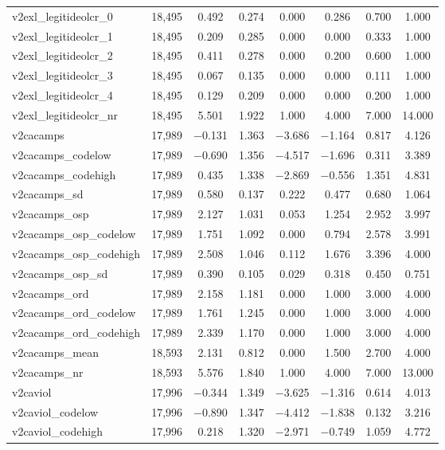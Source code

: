 \begin{table}[!htbp]
\begin{tabular}{@{\extracolsep{5pt}}lccccccc}
v2exl\_legitideolcr\_0 & 18,495 & 0.492 & 0.274 & 0.000 & 0.286 & 0.700 & 1.000 \\ 
v2exl\_legitideolcr\_1 & 18,495 & 0.209 & 0.285 & 0.000 & 0.000 & 0.333 & 1.000 \\ 
v2exl\_legitideolcr\_2 & 18,495 & 0.411 & 0.278 & 0.000 & 0.200 & 0.600 & 1.000 \\ 
v2exl\_legitideolcr\_3 & 18,495 & 0.067 & 0.135 & 0.000 & 0.000 & 0.111 & 1.000 \\ 
v2exl\_legitideolcr\_4 & 18,495 & 0.129 & 0.209 & 0.000 & 0.000 & 0.200 & 1.000 \\ 
v2exl\_legitideolcr\_nr & 18,495 & 5.501 & 1.922 & 1.000 & 4.000 & 7.000 & 14.000 \\ 
v2cacamps & 17,989 & $-$0.131 & 1.363 & $-$3.686 & $-$1.164 & 0.817 & 4.126 \\ 
v2cacamps\_codelow & 17,989 & $-$0.690 & 1.356 & $-$4.517 & $-$1.696 & 0.311 & 3.389 \\ 
v2cacamps\_codehigh & 17,989 & 0.435 & 1.338 & $-$2.869 & $-$0.556 & 1.351 & 4.831 \\ 
v2cacamps\_sd & 17,989 & 0.580 & 0.137 & 0.222 & 0.477 & 0.680 & 1.064 \\ 
v2cacamps\_osp & 17,989 & 2.127 & 1.031 & 0.053 & 1.254 & 2.952 & 3.997 \\ 
v2cacamps\_osp\_codelow & 17,989 & 1.751 & 1.092 & 0.000 & 0.794 & 2.578 & 3.991 \\ 
v2cacamps\_osp\_codehigh & 17,989 & 2.508 & 1.046 & 0.112 & 1.676 & 3.396 & 4.000 \\ 
v2cacamps\_osp\_sd & 17,989 & 0.390 & 0.105 & 0.029 & 0.318 & 0.450 & 0.751 \\ 
v2cacamps\_ord & 17,989 & 2.158 & 1.181 & 0.000 & 1.000 & 3.000 & 4.000 \\ 
v2cacamps\_ord\_codelow & 17,989 & 1.761 & 1.245 & 0.000 & 1.000 & 3.000 & 4.000 \\ 
v2cacamps\_ord\_codehigh & 17,989 & 2.339 & 1.170 & 0.000 & 1.000 & 3.000 & 4.000 \\ 
v2cacamps\_mean & 18,593 & 2.131 & 0.812 & 0.000 & 1.500 & 2.700 & 4.000 \\ 
v2cacamps\_nr & 18,593 & 5.576 & 1.840 & 1.000 & 4.000 & 7.000 & 13.000 \\ 
v2caviol & 17,996 & $-$0.344 & 1.349 & $-$3.625 & $-$1.316 & 0.614 & 4.013 \\ 
v2caviol\_codelow & 17,996 & $-$0.890 & 1.347 & $-$4.412 & $-$1.838 & 0.132 & 3.216 \\ 
v2caviol\_codehigh & 17,996 & 0.218 & 1.320 & $-$2.971 & $-$0.749 & 1.059 & 4.772 \\ 

\end{tabular}
\end{table}

